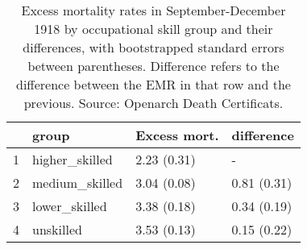 \begin{table}[ht]
\centering
\begin{tabular}{rlll}
  \hline
 & group & Excess mort. & difference \\ 
  \hline
1 & higher\_skilled & 2.23 (0.31) & - \\ 
  2 & medium\_skilled & 3.04 (0.08) & 0.81 (0.31) \\ 
  3 & lower\_skilled & 3.38 (0.18) & 0.34 (0.19) \\ 
  4 & unskilled & 3.53 (0.13) & 0.15 (0.22) \\ 
   \hline
\end{tabular}
\caption{Excess mortality rates in September-December 1918 by occupational skill group and their differences, with bootstrapped standard errors between parentheses. Difference refers to the difference between the EMR in that row and the previous. Source: Openarch Death Certificats.} 
\label{lab:emr_byskill_boot}
\end{table}
